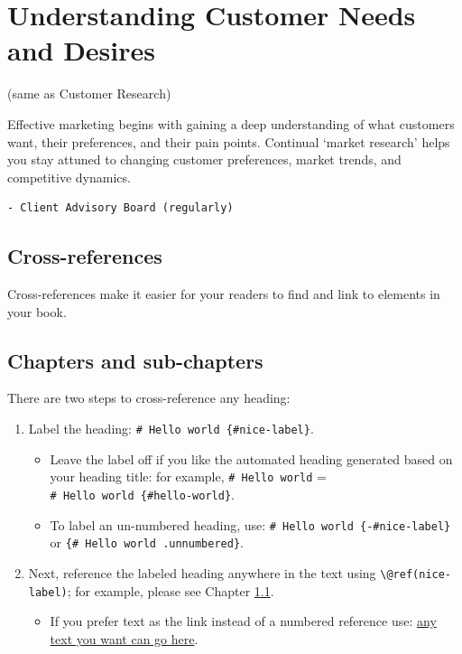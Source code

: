 \documentclass[
]{book}
\providecommand{\tightlist}{%
  \setlength{\itemsep}{0pt}\setlength{\parskip}{0pt}}
\begin{document}
\hypertarget{understanding-customer-needs-and-desires}{%
\chapter{Understanding Customer Needs and Desires}\label{understanding-customer-needs-and-desires}}

(same as Customer Research)

Effective marketing begins with gaining a deep understanding of what customers want, their preferences, and their pain points. Continual `market research' helps you stay attuned to changing customer preferences, market trends, and competitive dynamics.

\begin{verbatim}
- Client Advisory Board (regularly)
\end{verbatim}

\hypertarget{cross}{%
\section{Cross-references}\label{cross}}

Cross-references make it easier for your readers to find and link to elements in your book.

\hypertarget{chapters-and-sub-chapters}{%
\section{Chapters and sub-chapters}\label{chapters-and-sub-chapters}}

There are two steps to cross-reference any heading:

\begin{enumerate}
\def\labelenumi{\arabic{enumi}.}
\tightlist
\item
  Label the heading: \texttt{\#\ Hello\ world\ \{\#nice-label\}}.

  \begin{itemize}
  \tightlist
  \item
    Leave the label off if you like the automated heading generated based on your heading title: for example, \texttt{\#\ Hello\ world} = \texttt{\#\ Hello\ world\ \{\#hello-world\}}.
  \item
    To label an un-numbered heading, use: \texttt{\#\ Hello\ world\ \{-\#nice-label\}} or \texttt{\{\#\ Hello\ world\ .unnumbered\}}.
  \end{itemize}
\item
  Next, reference the labeled heading anywhere in the text using \texttt{\textbackslash{}@ref(nice-label)}; for example, please see Chapter \ref{cross}.

  \begin{itemize}
  \tightlist
  \item
    If you prefer text as the link instead of a numbered reference use: \protect\hyperlink{cross}{any text you want can go here}.
  \end{itemize}
\end{enumerate}
\end{document}
